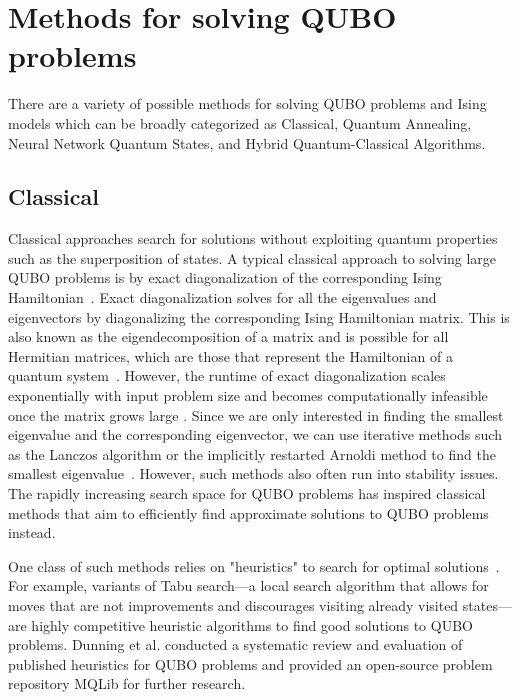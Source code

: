 \chapter{Methods for solving QUBO problems}

\label{review}
\vspace{2em}
There are a variety of possible methods for solving QUBO problems and Ising models which can be broadly categorized as Classical, Quantum Annealing, Neural Network Quantum States, and Hybrid Quantum-Classical Algorithms.

\section{Classical}
Classical approaches search for solutions without exploiting quantum properties such as the superposition of states. A typical classical approach to solving large QUBO problems is by exact diagonalization of the corresponding Ising Hamiltonian~\cite{b25}. Exact diagonalization solves for all the eigenvalues and eigenvectors by diagonalizing the corresponding Ising Hamiltonian matrix. This is also known as the eigendecomposition of a matrix and is possible for all Hermitian matrices, which are those that represent the Hamiltonian of a quantum system~\cite{b27}. However, the runtime of exact diagonalization scales exponentially with input problem size and becomes computationally infeasible once the matrix grows large \cite{b25}. Since we are only interested in finding the smallest eigenvalue and the corresponding eigenvector, we can use iterative methods such as the Lanczos algorithm or the implicitly restarted Arnoldi method to find the smallest eigenvalue~\cite{b28,b29}. However, such methods also often run into stability issues. The rapidly increasing search space for QUBO problems has inspired classical methods that aim to efficiently find approximate solutions to QUBO problems instead.

One class of such methods relies on "heuristics" to search for optimal solutions~\cite{b12}. For example, variants of Tabu search---a local search algorithm that allows for moves that are not improvements and discourages visiting already visited states---are highly competitive heuristic algorithms to find good solutions to QUBO problems\cite{b2,b30}. Dunning et al. conducted a systematic review and evaluation of published heuristics for QUBO problems and provided an open-source problem repository MQLib for further research. 

